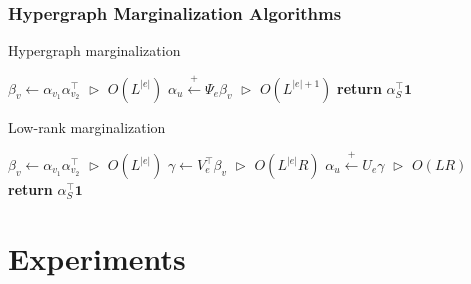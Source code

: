 \documentclass{beamer}
\begin{document}
\begin{frame}
\frametitle{Hypergraph Marginalization Algorithms}
\centering
\begin{algorithm}[H]
\caption{\label{alg:hypergraph-marg} Hypergraph marginalization}
\begin{algorithmic} 
\STATE $\beta_v \gets \alpha_{v_1}\alpha_{v_2}^\top$
    \hfill $\vartriangleright$ $O(L^{|e|})$
\STATE $\alpha_u \stackrel{+}{\gets} \Psi_e\beta_v$
    \hfill $\vartriangleright$ $O(L^{|e|+1})$
\ENDFOR
\STATE \textbf{return} $\alpha_S^\top \mathbf{1}$
\end{algorithmic}

\end{algorithm}

\begin{algorithm}[H]
\caption{\label{alg:low-rank-update} Low-rank marginalization}
\begin{algorithmic} 
\STATE $\beta_v \gets \alpha_{v_1}\alpha_{v_2}^\top$
    \hfill $\vartriangleright$ $O(L^{|e|})$
\STATE $\gamma \gets V_e^\top\beta_v$
    \hfill $\vartriangleright$ $O(L^{|e|}R)$
\STATE $\alpha_u \stackrel{+}{\gets} U_e\gamma $
    \hfill $\vartriangleright$ $O(LR)$
\ENDFOR
\STATE \textbf{return} $\alpha_S^\top\mathbf{1}$
\end{algorithmic} 
\end{algorithm}

\end{frame}


\section{Experiments}
\end{document}
